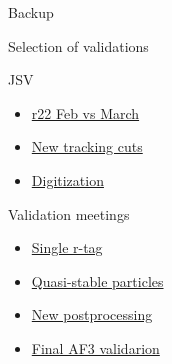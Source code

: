 \begin{frame}
    \centering \Huge Backup
\end{frame}

\begin{frame}{Selection of validations}
    \begin{block}{JSV}
        \begin{itemize}
            \item \href{https://indico.cern.ch/event/930453/}{r22 Feb vs March}
            \item \href{https://indico.cern.ch/event/935551/}{New tracking cuts}
            \item \href{https://indico.cern.ch/event/935556/}{Digitization}
        \end{itemize}
    \end{block}
    \begin{block}{Validation meetings}
        \begin{itemize}
            \item \href{https://indico.cern.ch/event/1010654/}{Single r-tag}
            \item \href{https://indico.cern.ch/event/1013678/}{Quasi-stable particles}
            \item \href{https://indico.cern.ch/event/1018797/}{New postprocessing}
            \item \href{https://indico.cern.ch/event/1021639/}{Final AF3 validarion}
        \end{itemize}
    \end{block}
\end{frame}